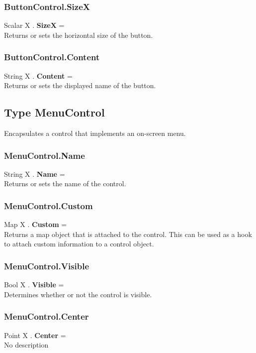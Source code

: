 \subsubsection{ButtonControl.SizeX \label{F:ButtonControl:SizeX}}
Scalar X . \textbf{SizeX} = \\
Returns or sets the horizontal size of the button.

\subsubsection{ButtonControl.Content \label{F:ButtonControl:Content}}
String X . \textbf{Content} = \\
Returns or sets the displayed name of the button.

\subsection{Type MenuControl \label{T:MenuControl}}
Encapsulates a control that implements an on-screen menu.

\subsubsection{MenuControl.Name \label{F:MenuControl:Name}}
String X . \textbf{Name} = \\
Returns or sets the name of the control.

\subsubsection{MenuControl.Custom \label{F:MenuControl:Custom}}
Map X . \textbf{Custom} = \\
Returns a map object that is attached to the control. This can be used as a hook to attach custom information to a control object.

\subsubsection{MenuControl.Visible \label{F:MenuControl:Visible}}
Bool X . \textbf{Visible} = \\
Determines whether or not the control is visible.

\subsubsection{MenuControl.Center \label{F:MenuControl:Center}}
Point X . \textbf{Center} = \\
No description

